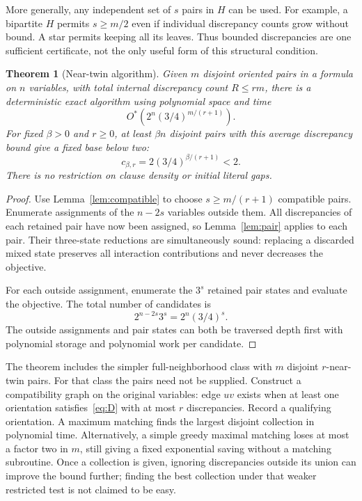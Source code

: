 \documentclass[11pt,a4paper]{article}
\newtheorem{theorem}{Theorem}
\newcommand{\Ostar}{O^{*}}
\begin{document}
More generally, any independent set of $s$ pairs in $H$ can be used.
For example, a bipartite $H$ permits $s\ge m/2$ even if individual
discrepancy counts grow without bound. A star permits keeping all its
leaves. Thus bounded discrepancies are one sufficient certificate,
not the only useful form of this structural condition.

\begin{theorem}[Near-twin algorithm]\label{thm:main}
Given $m$ disjoint oriented pairs in a formula on $n$ variables,
with total internal discrepancy count $R\le rm$,
there is a deterministic exact algorithm using polynomial space and
time
\begin{equation}
 \Ostar\left(2^n(3/4)^{m/(r+1)}\right).             \label{eq:time}
\end{equation}
For fixed $\beta>0$ and $r\ge0$, at least $\beta n$ disjoint pairs
with this average discrepancy bound give a fixed base below two:
\[
 c_{\beta,r}=2(3/4)^{\beta/(r+1)}<2.
\]
There is no restriction on clause density or initial literal gaps.
\end{theorem}
\begin{proof}
Use Lemma~\ref{lem:compatible} to choose $s\ge m/(r+1)$ compatible
pairs. Enumerate assignments of the $n-2s$ variables outside them.
All discrepancies of each retained pair have now been assigned, so
Lemma~\ref{lem:pair} applies to each pair. Their three-state reductions
are simultaneously sound: replacing a discarded mixed state preserves
all interaction contributions and never decreases the objective.

For each outside assignment, enumerate the $3^s$ retained pair states
and evaluate the objective. The total number of candidates is
\[
 2^{n-2s}3^s=2^n(3/4)^s.
\]
The outside assignments and pair states can both be traversed depth
first with polynomial storage and polynomial work per candidate.
\end{proof}

The theorem includes the simpler full-neighborhood class with $m$
disjoint $r$-near-twin pairs. For that class the pairs need not be supplied.
Construct a compatibility graph on the original variables: edge $uv$
exists when at least one orientation satisfies~\eqref{eq:D} with at most
$r$ discrepancies. Record a qualifying orientation. A maximum matching
finds the largest disjoint collection in polynomial time. Alternatively,
a simple greedy maximal matching loses at most a factor two in $m$,
still giving a fixed exponential saving without a matching subroutine.
Once a collection is given, ignoring discrepancies outside its union
can improve the bound further; finding the best collection under that
weaker restricted test is not claimed to be easy.
\end{document}
